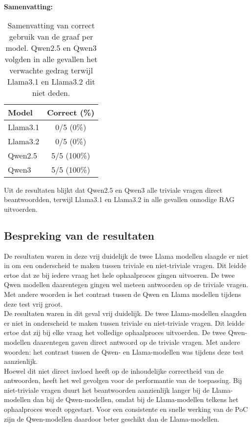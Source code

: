\noindent\textbf{Samenvatting:}  
\begin{table}[H]
    \begin{tabular}{|l|c|}
        \hline
        \textbf{Model} & \textbf{Correct (\%)} \\
        \hline
        Llama3.1 & 0/5 (0\%) \\
        Llama3.2 & 0/5 (0\%) \\
        Qwen2.5  & 5/5 (100\%) \\
        Qwen3    & 5/5 (100\%) \\
        \hline
    \end{tabular}
    \caption{Samenvatting van correct gebruik van de graaf per model. Qwen2.5 en Qwen3 volgden in alle gevallen het verwachte gedrag terwijl Llama3.1 en Llama3.2 dit niet deden.}
\end{table}

Uit de resultaten blijkt dat Qwen2.5 en Qwen3 alle triviale vragen direct beantwoordden, terwijl Llama3.1 en Llama3.2 in alle gevallen onnodige RAG uitvoerden.

\subsection{Bespreking van de resultaten}
De resultaten waren in deze vrij duidelijk de twee Llama modellen slaagde er niet in om een onderscheid te maken tussen triviale en niet-triviale vragen. Dit leidde ertoe dat ze bij iedere vraag het hele ophaalproces gingen uitvoeren. De twee Qwen modellen daarentegen gingen wel meteen antwoorden op de triviale vragen. Met andere woorden is het contrast tussen de Qwen en Llama modellen tijdens deze test vrij groot.
\\[1em]
De resultaten waren in dit geval vrij duidelijk. De twee Llama-modellen slaagden er niet in onderscheid te maken tussen triviale en niet-triviale vragen. Dit leidde ertoe dat zij bij elke vraag het volledige ophaalproces uitvoerden. De twee Qwen-modellen daarentegen gaven direct antwoord op de triviale vragen. Met andere woorden: het contrast tussen de Qwen- en Llama-modellen was tijdens deze test aanzienlijk.
\\[1em]
Hoewel dit niet direct invloed heeft op de inhoudelijke correctheid van de antwoorden, heeft het wel gevolgen voor de performantie van de toepassing. Bij niet-triviale vragen duurt het beantwoorden aanzienlijk langer bij de Llama-modellen dan bij de Qwen-modellen, omdat bij de Llama-modellen telkens het ophaalproces wordt opgestart. Voor een consistente en snelle werking van de PoC zijn de Qwen-modellen daardoor beter geschikt dan de Llama-modellen.


